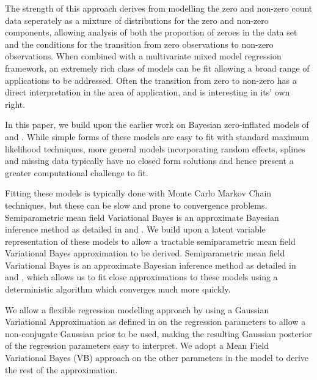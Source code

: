 \documentclass{amsart}[12pt]
\begin{document}
The strength of this approach derives from modelling the zero and non-zero count data seperately as a mixture
of distributions for the zero and non-zero components, allowing analysis of both the proportion of zeroes in
the data set and the conditions for the transition from zero observations to non-zero observations. When
combined with a multivariate mixed model regression framework, an extremely rich class of models can be fit
allowing a broad range of applications to be addressed. Often the transition from zero to non-zero has a
direct interpretation in the area of application, and is interesting in its' own right.

In this paper, we build upon the earlier work on Bayesian zero-inflated models of \citep{Ghosh20061360} and
\citep{VatsaWilson2014}. While simple forms of these models are easy to fit with standard maximum likelihood
techniques, more general models incorporating random effects, splines and missing data typically have no
closed form solutions and hence present a greater computational challenge to fit.

Fitting these models is typically done with Monte Carlo Markov Chain techniques, but these can be slow and
prone to convergence problems. Semiparametric mean field Variational Bayes is an approximate Bayesian
inference method as detailed in \citep{ormerod10} and \citep{RohdeWand2015}. We build upon a latent variable
representation of these models to allow a tractable semiparametric mean field Variational Bayes approximation
to be derived. Semiparametric mean field Variational Bayes is an approximate Bayesian inference method as
detailed in \citep{ormerod10} and \citep{RohdeWand2015}, which allows us to fit close approximations to these
models using a deterministic algorithm which converges much more quickly.

We allow a flexible regression modelling approach by using a Gaussian Variational Approximation as defined in
\citep{ormerod09} on the regression parameters to allow a non-conjugate Gaussian prior to be used, making the
resulting Gaussian posterior of the regression parameters easy to interpret. We adopt a Mean Field Variational
Bayes (VB) approach on the other parameters in the model to derive the rest of the approximation.
\end{document}
